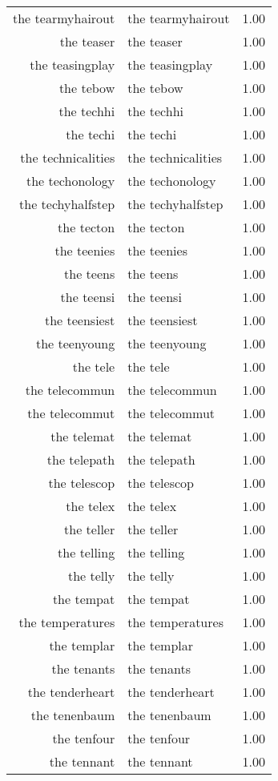 \begin{table}[ht]
\begin{tabular}{rlr}
  the tearmyhairout & the tearmyhairout & 1.00 \\ 
  the teaser & the teaser & 1.00 \\ 
  the teasingplay & the teasingplay & 1.00 \\ 
  the tebow & the tebow & 1.00 \\ 
  the techhi & the techhi & 1.00 \\ 
  the techi & the techi & 1.00 \\ 
  the technicalities & the technicalities & 1.00 \\ 
  the techonology & the techonology & 1.00 \\ 
  the techyhalfstep & the techyhalfstep & 1.00 \\ 
  the tecton & the tecton & 1.00 \\ 
  the teenies & the teenies & 1.00 \\ 
  the teens & the teens & 1.00 \\ 
  the teensi & the teensi & 1.00 \\ 
  the teensiest & the teensiest & 1.00 \\ 
  the teenyoung & the teenyoung & 1.00 \\ 
  the tele & the tele & 1.00 \\ 
  the telecommun & the telecommun & 1.00 \\ 
  the telecommut & the telecommut & 1.00 \\ 
  the telemat & the telemat & 1.00 \\ 
  the telepath & the telepath & 1.00 \\ 
  the telescop & the telescop & 1.00 \\ 
  the telex & the telex & 1.00 \\ 
  the teller & the teller & 1.00 \\ 
  the telling & the telling & 1.00 \\ 
  the telly & the telly & 1.00 \\ 
  the tempat & the tempat & 1.00 \\ 
  the temperatures & the temperatures & 1.00 \\ 
  the templar & the templar & 1.00 \\ 
  the tenants & the tenants & 1.00 \\ 
  the tenderheart & the tenderheart & 1.00 \\ 
  the tenenbaum & the tenenbaum & 1.00 \\ 
  the tenfour & the tenfour & 1.00 \\ 
  the tennant & the tennant & 1.00 \\ 

\end{tabular}
\end{table}

